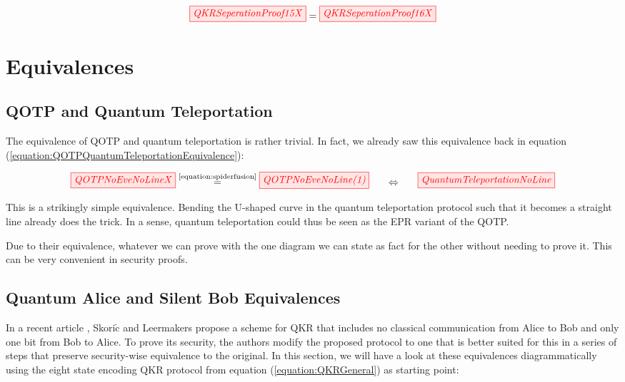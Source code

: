 \documentclass[]{article}
\newcommand{\equaltext}[1]{\ensuremath{\stackrel{\text{#1}}{=}}}
\begin{document}
\begin{equation}
\label{equation:QKRSeparates}
\tikzfig{QKRSeperationProof15X} = \tikzfig{QKRSeperationProof16X}
\end{equation}

\section{Equivalences}
\label{Equivalences}

\subsection{QOTP and Quantum Teleportation}

The equivalence of QOTP and quantum teleportation is rather trivial. In fact, we already saw this equivalence back in equation (\ref{equation:QOTPQuantumTeleportationEquivalence}):

\begin{equation}
\tikzfig{QOTPNoEveNoLineX} \equaltext{\ref{equation:spiderfusion}} \tikzfig{QOTPNoEveNoLine(1)}~~~~~ \Leftrightarrow ~~~~~\tikzfig{QuantumTeleportationNoLine}
\end{equation}

This is a strikingly simple equivalence. Bending the U-shaped curve in the quantum teleportation protocol such that it becomes a straight line already does the trick. In a sense, quantum teleportation could thus be seen as the EPR variant of the QOTP. 

Due to their equivalence, whatever we can prove with the one diagram we can state as fact for the other without needing to prove it. This can be very convenient in security proofs.

\subsection{Quantum Alice and Silent Bob Equivalences}

\label{section:QAaSBEequivalences}
In a recent article \cite{Leermakers2019}, Skori$\check{\textrm{c}}$ and Leermakers propose a scheme for QKR that includes no classical communication from Alice to Bob and only one bit from Bob to Alice. To prove its security, the authors modify the proposed protocol to one that is better suited for this in a series of steps that preserve security-wise equivalence to the original. In this section, we will have a look at these equivalences diagrammatically using the eight state encoding QKR protocol from equation (\ref{equation:QKRGeneral}) as starting point:
\end{document}

